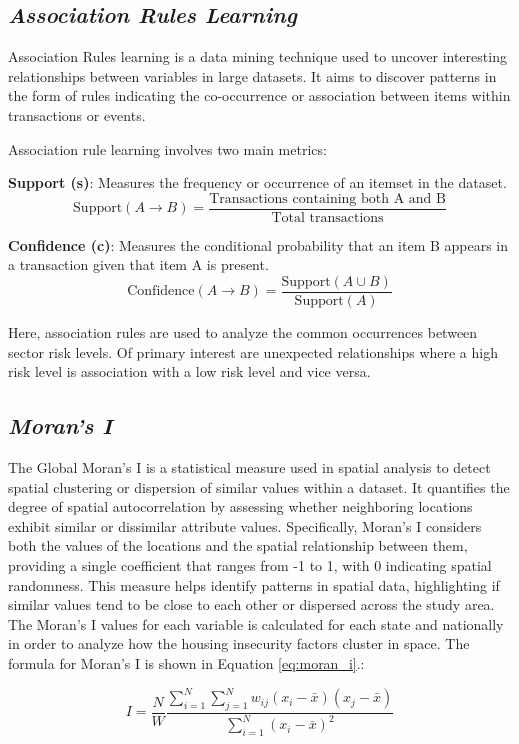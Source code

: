 \subsection{\textit{Association Rules Learning}}

Association Rules learning is a data mining technique used to uncover interesting relationships between variables in large datasets. It aims to discover patterns in the form of rules indicating the co-occurrence or association between items within transactions or events.

Association rule learning involves two main metrics:

\textbf{Support (s)}: Measures the frequency or occurrence of an itemset in the dataset.
\[
\text{Support}(A \rightarrow B) = \frac{\text{Transactions containing both A and B}}{\text{Total transactions}}
\]

\textbf{Confidence (c)}: Measures the conditional probability that an item B appears in a transaction given that item A is present.
\[
\text{Confidence}(A \rightarrow B) = \frac{\text{Support}(A \cup B)}{\text{Support}(A)}
\]

Here, association rules are used to analyze the common occurrences between sector risk levels. Of primary interest are unexpected relationships where a high risk level is association with a low risk level and vice versa. 


\subsection{\textit{Moran's I}}
The Global Moran's I is a statistical measure used in spatial analysis to detect spatial clustering or dispersion of similar values within a dataset. It quantifies the degree of spatial autocorrelation by assessing whether neighboring locations exhibit similar or dissimilar attribute values. Specifically, Moran's I considers both the values of the locations and the spatial relationship between them, providing a single coefficient that ranges from -1 to 1, with 0 indicating spatial randomness. This measure helps identify patterns in spatial data, highlighting if similar values tend to be close to each other or dispersed across the study area. The Moran's I values for each variable is calculated for each state and nationally in order to analyze how the housing insecurity factors cluster in space. The formula for Moran's I is shown in Equation \ref{eq:moran_i}.:

\begin{equation}\label{eq:moran_i}
    I = \frac{N}{W} \frac{\sum_{i=1}^{N} \sum_{j=1}^{N} w_{ij} (x_i - \bar{x})(x_j - \bar{x})}{\sum_{i=1}^{N} (x_i - \bar{x})^2}
\end{equation}

